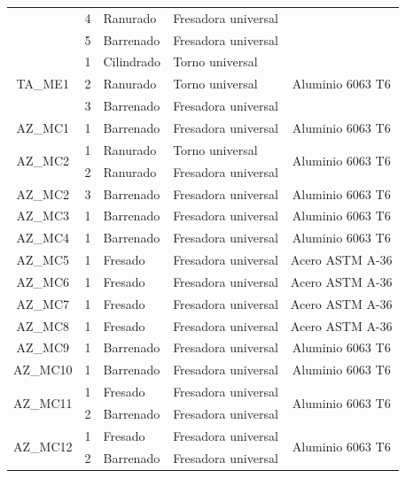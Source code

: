 \begin{longtable}{@{}|c|r|l|l|c|}
    \cline{2-4}      & 4 & Ranurado & Fresadora universal &  \\
    \cline{2-4}      & 5 & Barrenado & Fresadora universal &  \\
    \hline
    \multirow{3}[6]{*}{TA\_ME1} & 1 & Cilindrado & Torno universal & \multirow{3}[6]{*}{Aluminio 6063 T6} \\
    \cline{2-4}      & 2 & Ranurado & Torno universal &  \\
    \cline{2-4}      & 3 & Barrenado & Fresadora universal &  \\
    \hline
    AZ\_MC1 & 1 & Barrenado & Fresadora universal & Aluminio 6063 T6 \\
    \hline
    \multirow{2}[6]{*}{AZ\_MC2} & 1 & Ranurado & Torno universal & \multirow{2}[6]{*}{Aluminio 6063 T6} \\
    \cline{2-4}      & 2 & Ranurado & Fresadora universal &  \\
    \hline
    AZ\_MC2      & 3 & Barrenado & Fresadora universal & Aluminio 6063 T6 \\
    \hline
    AZ\_MC3 & 1 & Barrenado & Fresadora universal & Aluminio 6063 T6 \\
    \hline
    AZ\_MC4 & 1 & Barrenado & Fresadora universal & Aluminio 6063 T6 \\
    \hline
    AZ\_MC5 & 1 & Fresado & Fresadora universal & Acero ASTM A-36 \\
    \hline
    AZ\_MC6 & 1 & Fresado & Fresadora universal & Acero ASTM A-36 \\
    \hline
    AZ\_MC7 & 1 & Fresado & Fresadora universal & Acero ASTM A-36 \\
    \hline
    AZ\_MC8 & 1 & Fresado & Fresadora universal & Acero ASTM A-36 \\
    \hline
    AZ\_MC9 & 1 & Barrenado & Fresadora universal & Aluminio 6063 T6 \\
    \hline
    AZ\_MC10 & 1 & Barrenado & Fresadora universal & Aluminio 6063 T6 \\
    \hline
    \multirow{2}[4]{*}{AZ\_MC11} & 1 & Fresado & Fresadora universal & \multirow{2}[4]{*}{Aluminio 6063 T6} \\
    \cline{2-4}      & 2 & Barrenado & Fresadora universal &  \\
    \hline
    \multirow{2}[4]{*}{AZ\_MC12} & 1 & Fresado & Fresadora universal & \multirow{2}[4]{*}{Aluminio 6063 T6} \\
    \cline{2-4}      & 2 & Barrenado & Fresadora universal &  \\
    \hline

\end{longtable}
